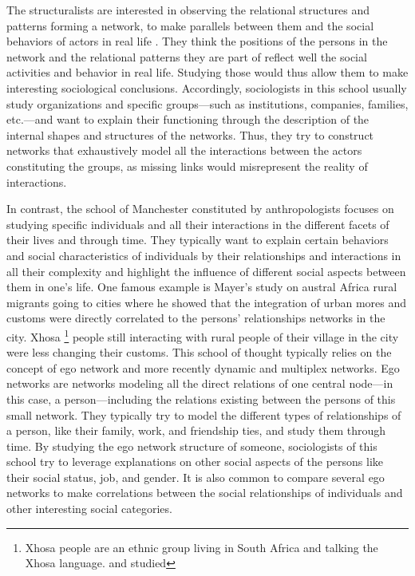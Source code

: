The structuralists are interested in observing the relational structures and patterns forming a network, to make parallels between them and the social behaviors of actors in real life \cite{lazegaReseaux}.
They think the positions of the persons in the network and the relational patterns they are part of reflect well the social activities and behavior in real life.
Studying those would thus allow them to make interesting sociological conclusions.
Accordingly, sociologists in this school usually study organizations and specific groups---such as institutions, companies, families, etc.---and want to explain their functioning through the description of the internal shapes and structures of the networks.
Thus, they try to construct networks that exhaustively model all the interactions between the actors constituting the groups, as missing links would misrepresent the reality of interactions.

In contrast, the school of Manchester constituted by anthropologists focuses on studying specific individuals and all their interactions in the different facets of their lives and through time.
They typically want to explain certain behaviors and social characteristics of individuals by their relationships and interactions in all their complexity and highlight the influence of different social aspects between them in one's life.
One famous example is Mayer's study on austral Africa rural migrants going to cities \cite{mayerMigrancyStudyAfricans1962} where he showed that the integration of urban mores and customs were directly correlated to the persons' relationships networks in the city.
Xhosa \footnote{Xhosa people are an ethnic group living in South Africa and talking the Xhosa language. and studied} people still interacting with rural people of their village in the city were less changing their customs.
This school of thought typically relies on the concept of ego network and more recently dynamic and multiplex networks.
Ego networks are networks modeling all the direct relations of one central node---in this case, a person---including the relations existing between the persons of this small network.
They typically try to model the different types of relationships of a person, like their family, work, and friendship ties, and study them through time.
By studying the ego network structure of someone, sociologists of this school try to leverage explanations on other social aspects of the persons like their social status, job, and gender.
It is also common to compare several ego networks to make correlations between the social relationships of individuals and other interesting social categories.

